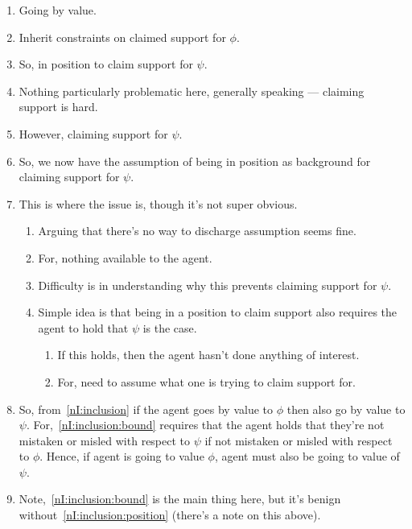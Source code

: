 


\begin{note}[Revised]
  \begin{enumerate}
  \item Going by value.
  \item Inherit constraints on claimed support for \(\phi\).
  \item So, in position to claim support for \(\psi\).
  \item Nothing particularly problematic here, generally speaking --- claiming support is hard.
  \item However, claiming support for \(\psi\).
  \item So, we now have the assumption of being in position as background for claiming support for \(\psi\).
  \item This is where the issue is, though it's not super obvious.
    \begin{enumerate}
    \item Arguing that there's no way to discharge assumption seems fine.
    \item For, nothing available to the agent.
    \item Difficulty is in understanding why this prevents claiming support for \(\psi\).
    \item Simple idea is that being in a position to claim support also requires the agent to hold that \(\psi\) is the case.
      \begin{enumerate}
      \item If this holds, then the agent hasn't done anything of interest.
      \item For, need to assume what one is trying to claim support for.
      \end{enumerate}
    \end{enumerate}
  \item So, from~\ref{nI:inclusion} if the agent goes by value to \(\phi\) then also go by value to \(\psi\).
    For,~\ref{nI:inclusion:bound} requires that the agent holds that they're not mistaken or misled with respect to \(\psi\) if not mistaken or misled with respect to \(\phi\).
    Hence, if agent is going to value \(\phi\), agent must also be going to value of \(\psi\).
  \item Note,~\ref{nI:inclusion:bound} is the main thing here, but it's benign without~\ref{nI:inclusion:position} (there's a note on this above).

\end{enumerate}
\end{note}
